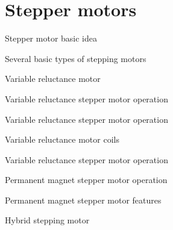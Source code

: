 \documentclass[compress]{beamer}
\makeatletter
\let\beamer@writeslidentry@miniframeson=\beamer@writeslidentry
\newcommand*{\miniframeson}{\let\beamer@writeslidentry=\beamer@writeslidentry@miniframeson}
\makeatother
\begin{document}
\miniframeson



\section{Stepper motors}
{
    \begin{frame}{Stepper motor basic idea}
    \end{frame}
}

{
    \begin{frame}{Several basic types of stepping motors}
    \end{frame}
}

{
    \begin{frame}{Variable reluctance motor}
    \end{frame}
}

{
    \begin{frame}{Variable reluctance stepper motor operation}
    \end{frame}
}

{
    \begin{frame}{Variable reluctance stepper motor operation}
    \end{frame}
}

{
    \begin{frame}{Variable reluctance motor coils}
    \end{frame}
}

{
    \begin{frame}{Variable reluctance stepper motor operation}
    \end{frame}
}

{
    \begin{frame}{Permanent magnet stepper motor operation}
    \end{frame}
}

{
    \begin{frame}{Permanent magnet stepper motor features}
    \end{frame}
}

{
    \begin{frame}{Hybrid stepping motor}
    \end{frame}
}
\end{document}
